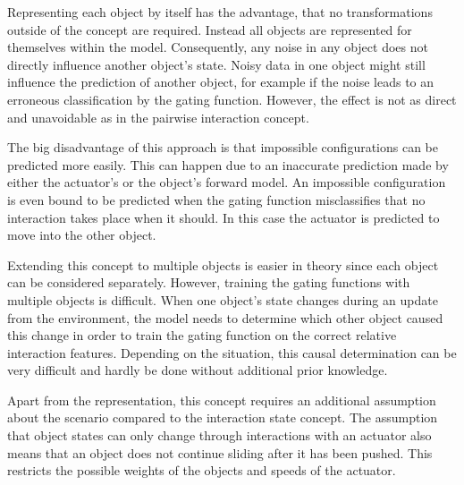 Representing each object by itself has the advantage, that no transformations outside of the concept are required. Instead all objects are represented for themselves within the model. 
Consequently, any noise in any object does not directly influence another object's state. Noisy data in one object might still influence the prediction of another object, for example if the noise leads to an erroneous classification by the gating function. However, the effect is not as direct and unavoidable as in the pairwise interaction concept.

The big disadvantage of this approach is that impossible configurations can be predicted more easily. This can happen due to an inaccurate prediction made by either the actuator's or the object's forward model.
An impossible configuration is even bound to be predicted when the gating function misclassifies that no interaction takes place when it should. In this case the actuator is predicted to move into the other object.

Extending this concept to multiple objects is easier in theory since each object can be considered separately. However, training the gating functions with multiple objects is difficult. When one object's state changes during an update from the environment, the model needs to determine which other object caused this change in order to train the gating function on the correct relative interaction features. Depending on the situation, this causal determination can be very difficult and hardly be done without additional prior knowledge. 

Apart from the representation, this concept requires an additional assumption about the scenario compared to the interaction state concept. The assumption that object states can only change through interactions with an actuator also means that an object does not continue sliding after it has been pushed. This restricts the possible weights of the objects and speeds of the actuator.

